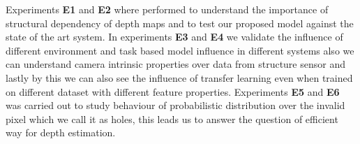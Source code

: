 Experiments \textbf{E1} and \textbf{E2} where performed to understand the importance of structural dependency of depth maps and to test our proposed model against the state of the art system. In experiments \textbf{E3} and \textbf{E4} we validate the influence of different environment and task based model influence in different systems also we can understand camera intrinsic properties over data from structure sensor and lastly by this we can also see the influence of transfer learning even when trained on different dataset with different feature properties. Experiments \textbf{E5} and \textbf{E6} was carried out to study behaviour of probabilistic distribution over the invalid pixel which we call it as holes, this leads us to answer the question of efficient way for depth estimation.

 


